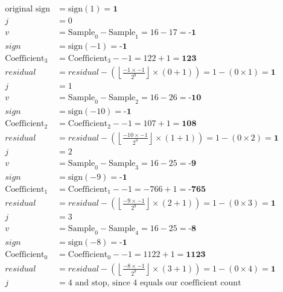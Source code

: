 {
\begin{align*}
\text{original sign} &= \text{sign}(1) = \textbf{1} \\
j &= 0 \\
v &= \text{Sample}_0 - \text{Sample}_{1} = 16 - 17 = \textbf{-1} \\
sign &= \text{sign}(-1) = \textbf{-1} \\
\text{Coefficient}_3 &= \text{Coefficient}_3 - -1 = 122 + 1 = \textbf{123} \\
residual &= residual - \left( \left\lfloor\frac{-1 \times -1}{2 ^ 9}\right\rfloor \times (0 + 1)\right) = 1 - (0 \times 1) = \textbf{1} \\
j &= 1 \\
v &= \text{Sample}_0 - \text{Sample}_{2} = 16 - 26 = \textbf{-10} \\
sign &= \text{sign}(-10) = \textbf{-1} \\
\text{Coefficient}_2 &= \text{Coefficient}_2 - -1 = 107 + 1 = \textbf{108} \\
residual &= residual - \left( \left\lfloor\frac{-10 \times -1}{2 ^ 9}\right\rfloor \times (1 + 1)\right) = 1 - (0 \times 2) = \textbf{1} \\
j &= 2 \\
v &= \text{Sample}_0 - \text{Sample}_{3} = 16 - 25 = \textbf{-9} \\
sign &= \text{sign}(-9) = \textbf{-1} \\
\text{Coefficient}_1 &= \text{Coefficient}_1 - -1 = -766 + 1 = \textbf{-765} \\
residual &= residual - \left( \left\lfloor\frac{-9 \times -1}{2 ^ 9}\right\rfloor \times (2 + 1)\right) = 1 - (0 \times 3) = \textbf{1} \\
j &= 3 \\
v &= \text{Sample}_0 - \text{Sample}_{4} = 16 - 25 = \textbf{-8} \\
sign &= \text{sign}(-8) = \textbf{-1} \\
\text{Coefficient}_0 &= \text{Coefficient}_0 - -1 = 1122 + 1 = \textbf{1123} \\
residual &= residual - \left( \left\lfloor\frac{-8 \times -1}{2 ^ 9}\right\rfloor \times (3 + 1)\right) = 1 - (0 \times 4) = \textbf{1} \\
j &= 4\text{ and stop, since 4 equals our coefficient count} \\
\end{align*}
}

\clearpage

